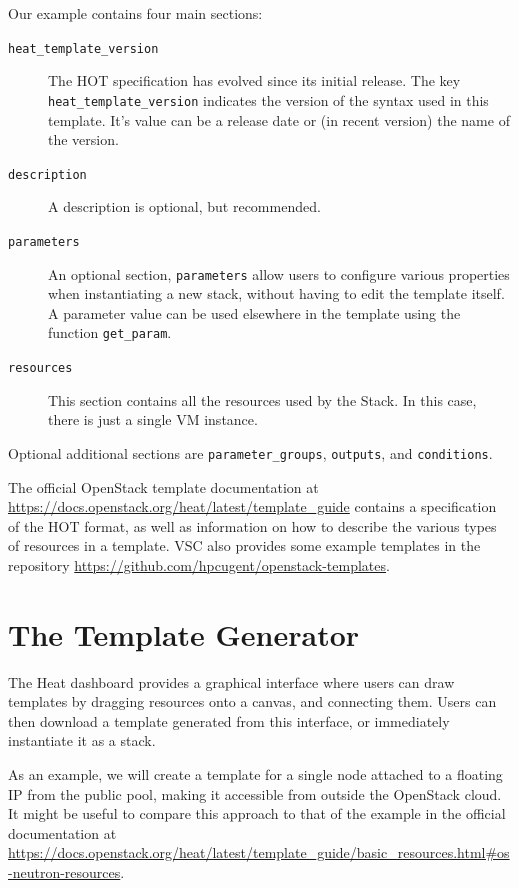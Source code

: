 Our example contains four main sections:
\begin{description}
\item[\texttt{heat\_template\_version}] The \textsc{HOT} specification
  has evolved since its initial release.  The key
  \lstinline{heat_template_version} indicates the version of the
  syntax used in this template.  It's value can be a release date or
  (in recent version) the name of the version.
\item[\texttt{description}] A description is optional, but
  recommended.
\item[\texttt{parameters}] An optional section, \lstinline{parameters}
  allow users to configure various properties when instantiating a new
  stack, without having to edit the template itself.  A parameter
  value can be used elsewhere in the template using the function
  \lstinline{get_param}.
\item[\texttt{resources}] This section contains all the resources used
  by the Stack.  In this case, there is just a single VM instance.
\end{description}
Optional additional sections are \lstinline{parameter_groups},
\lstinline{outputs}, and \lstinline{conditions}.

The official OpenStack template documentation at
\url{https://docs.openstack.org/heat/latest/template_guide} contains a
specification of the \textsc{HOT} format, as well as information on
how to describe the various types of resources in a template.
\textsc{VSC} also provides some example templates in the repository
\url{https://github.com/hpcugent/openstack-templates}.

\section{The Template Generator}\label{sec:template-generator}
The Heat dashboard provides a graphical interface where users can draw
templates by dragging resources onto a canvas, and connecting them.
Users can then download a template generated from this interface, or
immediately instantiate it as a stack.

As an example, we will create a template for a single node attached to
a floating IP from the public pool, making it accessible from outside
the OpenStack cloud.  It might be useful to compare this approach to
that of the example in the official documentation at
\url{https://docs.openstack.org/heat/latest/template_guide/basic_resources.html#os-neutron-resources}.

